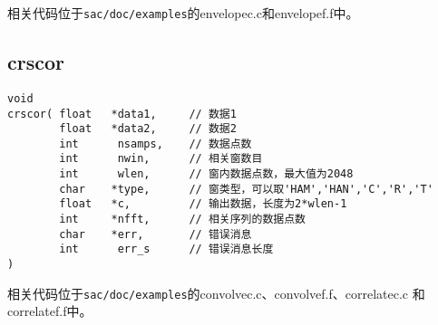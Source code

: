 相关代码位于\lstinline{sac/doc/examples}的envelopec.c和envelopef.f中。

\subsection{crscor}
\begin{lstlisting}[style=C]
void                                                                                  
crscor( float   *data1,     // 数据1
        float   *data2,     // 数据2                                       
        int      nsamps,    // 数据点数                                               
        int      nwin,      // 相关窗数目                                            
        int      wlen,      // 窗内数据点数，最大值为2048                                          
        char    *type,      // 窗类型，可以取'HAM','HAN','C','R','T'
        float   *c,         // 输出数据，长度为2*wlen-1
        int     *nfft,      // 相关序列的数据点数                            
        char    *err,       // 错误消息                                  
        int      err_s      // 错误消息长度
)
\end{lstlisting}

相关代码位于\lstinline{sac/doc/examples}的convolvec.c、convolvef.f、correlatec.c
和correlatef.f中。
